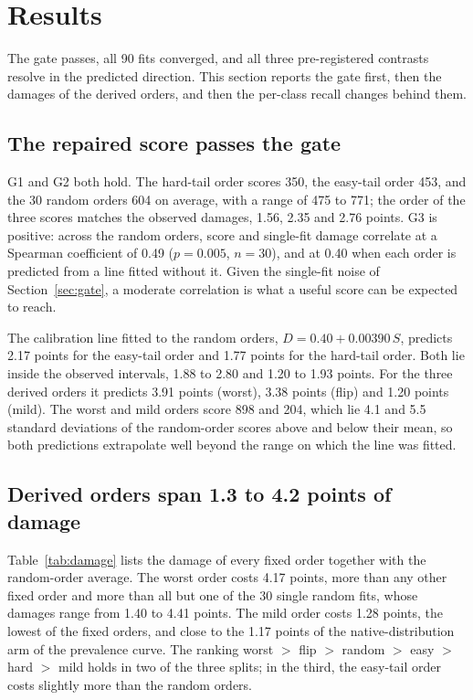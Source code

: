 \section{Results}
\label{sec:results}
The gate passes, all 90 fits converged, and all three pre-registered contrasts resolve in the predicted direction. This section reports the gate first, then the damages of the derived orders, and then the per-class recall changes behind them.

\subsection{The repaired score passes the gate}
\label{sec:gate-results}
G1 and G2 both hold. The hard-tail order scores 350, the easy-tail order 453, and the 30 random orders 604 on average, with a range of 475 to 771; the order of the three scores matches the observed damages, 1.56, 2.35 and 2.76 points. G3 is positive: across the random orders, score and single-fit damage correlate at a Spearman coefficient of 0.49 ($p=0.005$, $n=30$), and at 0.40 when each order is predicted from a line fitted without it. Given the single-fit noise of Section~\ref{sec:gate}, a moderate correlation is what a useful score can be expected to reach.

The calibration line fitted to the random orders, $D = 0.40 + 0.00390\,S$, predicts 2.17 points for the easy-tail order and 1.77 points for the hard-tail order. Both lie inside the observed intervals, 1.88 to 2.80 and 1.20 to 1.93 points. For the three derived orders it predicts 3.91 points (worst), 3.38 points (flip) and 1.20 points (mild). The worst and mild orders score 898 and 204, which lie 4.1 and 5.5 standard deviations of the random-order scores above and below their mean, so both predictions extrapolate well beyond the range on which the line was fitted.

\subsection{Derived orders span 1.3 to 4.2 points of damage}
\label{sec:damage}
Table~\ref{tab:damage} lists the damage of every fixed order together with the random-order average. The worst order costs 4.17 points, more than any other fixed order and more than all but one of the 30 single random fits, whose damages range from 1.40 to 4.41 points. The mild order costs 1.28 points, the lowest of the fixed orders, and close to the 1.17 points of the native-distribution arm of the prevalence curve. The ranking worst $>$ flip $>$ random $>$ easy $>$ hard $>$ mild holds in two of the three splits; in the third, the easy-tail order costs slightly more than the random orders.

